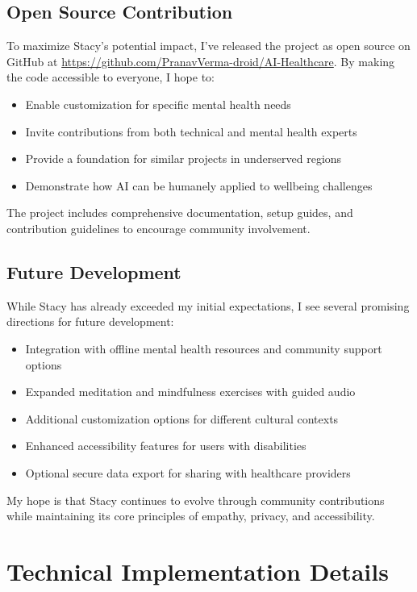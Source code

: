\documentclass[12pt]{article}
\begin{document}
\subsection{Open Source Contribution}

To maximize Stacy's potential impact, I've released the project as open source on GitHub at \url{https://github.com/PranavVerma-droid/AI-Healthcare}. By making the code accessible to everyone, I hope to:

\begin{itemize}
    \item Enable customization for specific mental health needs
    \item Invite contributions from both technical and mental health experts
    \item Provide a foundation for similar projects in underserved regions
    \item Demonstrate how AI can be humanely applied to wellbeing challenges
\end{itemize}

The project includes comprehensive documentation, setup guides, and contribution guidelines to encourage community involvement.

\subsection{Future Development}

While Stacy has already exceeded my initial expectations, I see several promising directions for future development:

\begin{itemize}
    \item Integration with offline mental health resources and community support options
    \item Expanded meditation and mindfulness exercises with guided audio
    \item Additional customization options for different cultural contexts
    \item Enhanced accessibility features for users with disabilities
    \item Optional secure data export for sharing with healthcare providers
\end{itemize}

My hope is that Stacy continues to evolve through community contributions while maintaining its core principles of empathy, privacy, and accessibility.

\section{Technical Implementation Details}
\end{document}
